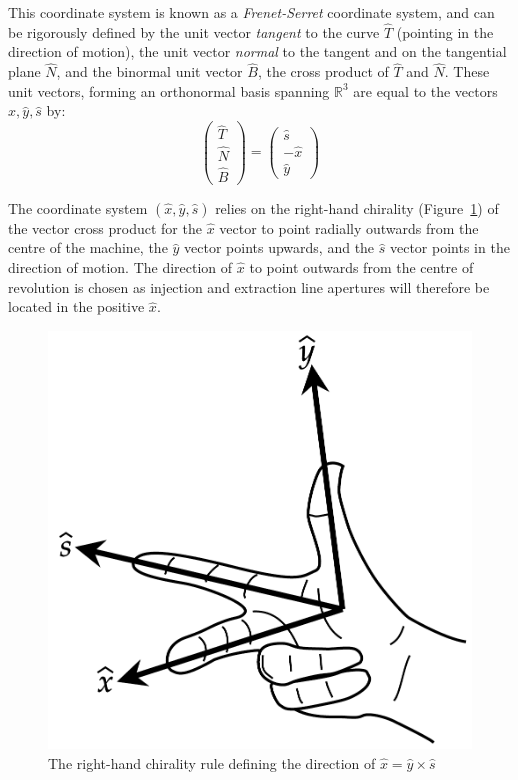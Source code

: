 \documentclass[11pt]{report}
\begin{document}
This coordinate system is known as a {\it Frenet-Serret} coordinate system, and can be rigorously defined by the unit vector {\it tangent} to the curve $\hat T$ (pointing in the direction of motion), the unit vector {\it normal} to the tangent and on the tangential plane $\hat N$, and the binormal unit vector $\hat B$, the cross product of $\hat T$ and $\hat N$. These unit vectors, forming an orthonormal basis spanning $\mathbb{R}^3$ are equal to the vectors $\hat x, \hat y, \hat s$ by:
\begin{equation}
\begin{pmatrix}\hat T\\\hat N\\\hat B \end{pmatrix}=\begin{pmatrix}\hat s\\-\hat x\\\hat y \end{pmatrix}
\end{equation}

The coordinate system $(\hat x, \hat y, \hat s)$ relies on the right-hand chirality (Figure~\ref{fig:rhr}) of the vector cross product for the $\hat x$ vector to point radially outwards from the centre of the machine, the $\hat y$ vector points upwards, and the $\hat s$ vector points in the direction of motion. The direction of $\hat x$ to point outwards from the centre of revolution is chosen as injection and extraction line apertures will therefore be located in the positive $\hat x$.

\begin{figure}[!h]
\begin{center}
\includegraphics[scale=.25]{rhr.pdf}
\caption{The right-hand chirality rule defining the direction of $\hat x = \hat y \times \hat s$}\label{fig:rhr}
\end{center}
\end{figure}
\end{document}
